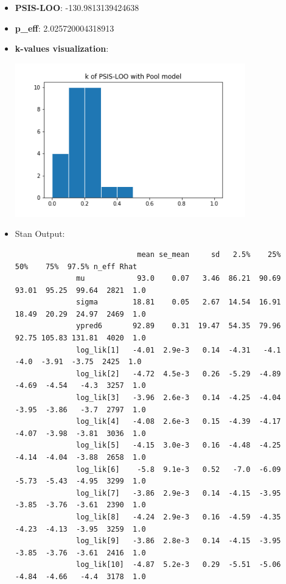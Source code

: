 \documentclass[11pt,a4paper,english]{article}
\begin{document}
        \begin{itemize}
          \item \textbf{PSIS-LOO}: -130.9813139424638
          \item \textbf{p\_eff}: 2.025720004318913
          \item \textbf{k-values visualization}:
            \begin{center}
              \includegraphics[width=10cm]{pooled_hist.png}
            \end{center}
          \item Stan Output:
            \begin{verbatim}
                            mean se_mean     sd   2.5%    25%    50%    75%  97.5% n_eff Rhat
              mu            93.0    0.07   3.46  86.21  90.69  93.01  95.25  99.64  2821  1.0
              sigma        18.81    0.05   2.67  14.54  16.91  18.49  20.29  24.97  2469  1.0
              ypred6       92.89    0.31  19.47  54.35  79.96  92.75 105.83 131.81  4020  1.0
              log_lik[1]   -4.01  2.9e-3   0.14  -4.31   -4.1   -4.0  -3.91  -3.75  2425  1.0
              log_lik[2]   -4.72  4.5e-3   0.26  -5.29  -4.89  -4.69  -4.54   -4.3  3257  1.0
              log_lik[3]   -3.96  2.6e-3   0.14  -4.25  -4.04  -3.95  -3.86   -3.7  2797  1.0
              log_lik[4]   -4.08  2.6e-3   0.15  -4.39  -4.17  -4.07  -3.98  -3.81  3036  1.0
              log_lik[5]   -4.15  3.0e-3   0.16  -4.48  -4.25  -4.14  -4.04  -3.88  2658  1.0
              log_lik[6]    -5.8  9.1e-3   0.52   -7.0  -6.09  -5.73  -5.43  -4.95  3299  1.0
              log_lik[7]   -3.86  2.9e-3   0.14  -4.15  -3.95  -3.85  -3.76  -3.61  2390  1.0
              log_lik[8]   -4.24  2.9e-3   0.16  -4.59  -4.35  -4.23  -4.13  -3.95  3259  1.0
              log_lik[9]   -3.86  2.8e-3   0.14  -4.15  -3.95  -3.85  -3.76  -3.61  2416  1.0
              log_lik[10]  -4.87  5.2e-3   0.29  -5.51  -5.06  -4.84  -4.66   -4.4  3178  1.0

\end{verbatim}
\end{itemize}
\end{document}
